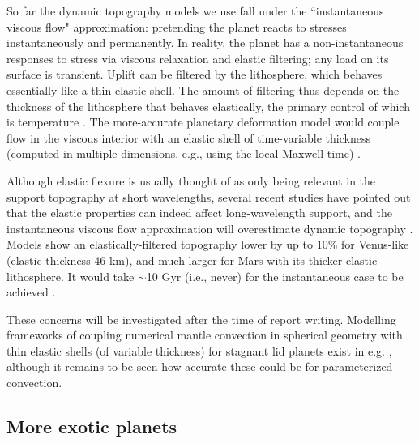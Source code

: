 So far the dynamic topography models we use fall under the ``instantaneous viscous flow" approximation: pretending the planet reacts to stresses instantaneously and permanently. In reality, the planet has a non-instantaneous responses to stress via viscous relaxation and elastic filtering; any load on its surface is transient. Uplift can be filtered by the lithosphere, which behaves essentially like a thin elastic shell. The amount of filtering thus depends on the thickness of the lithosphere that behaves elastically, the primary control of which is temperature \citep{Watts2001}. The more-accurate planetary deformation model would couple flow in the viscous interior with an elastic shell of time-variable thickness (computed in multiple dimensions, e.g., using the local Maxwell time) \citep[e.g.,][]{Dumoulin2013}. 

Although elastic flexure is usually thought of as only being relevant in the support topography at short wavelengths, several recent studies have pointed out that the elastic properties can indeed affect long-wavelength support, and the instantaneous viscous flow approximation will overestimate dynamic topography \citet{Zhong2002, Golle2012, Dumoulin2013}. Models show an elastically-filtered topography lower by up to 10\% for Venus-like (elastic thickness 46 km), and much larger for Mars with its thicker elastic lithosphere. It would take $\sim$10 Gyr (i.e., never) for the instantaneous case to be achieved \citep{Zhong2002, Dumoulin2013}. 

These concerns will be investigated after the time of report writing. Modelling frameworks of coupling numerical mantle convection in spherical geometry with thin elastic shells (of variable thickness) for stagnant lid planets exist in e.g. \citet{Zhong2002, Beuthe2008, Golle2012, Dumoulin2013, Patocka2017}, although it remains to be seen how accurate these could be for parameterized convection.





\subsection{More exotic planets} \label{sec:future-exoticplanets}

